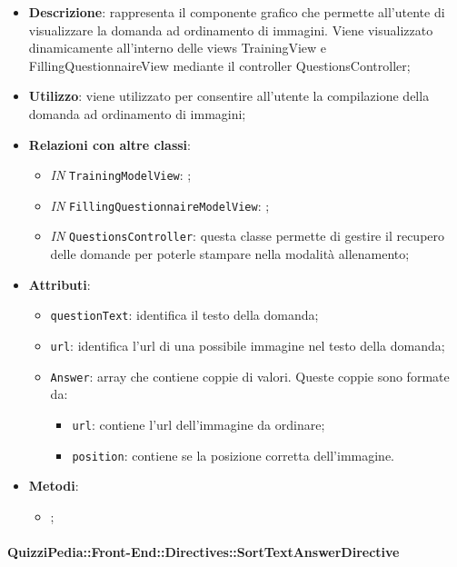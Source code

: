 		\begin{itemize}
			\item \textbf{Descrizione}: rappresenta il componente grafico che permette all'utente di visualizzare la domanda ad ordinamento di immagini. Viene visualizzato dinamicamente all'interno delle views TrainingView e FillingQuestionnaireView mediante il controller QuestionsController;
			\item \textbf{Utilizzo}: viene utilizzato per consentire all'utente la compilazione della domanda ad ordinamento di immagini;
			\item \textbf{Relazioni con altre classi}: 
			\begin{itemize}
				\item \textit{IN} \texttt{TrainingModelView}: ; 
				\item \textit{IN} \texttt{FillingQuestionnaireModelView}: ;
				\item \textit{IN} \texttt{QuestionsController}: questa classe permette di gestire il recupero delle domande per poterle stampare nella modalità allenamento;
			\end{itemize}
			\item \textbf{Attributi}: 
			\begin{itemize}
				\item \texttt{questionText}: identifica il testo della domanda;
				\item \texttt{url}: identifica l'url di una possibile immagine nel testo della domanda;
				\item \texttt{Answer}: array che contiene coppie di valori. Queste coppie sono formate da:
				\begin{itemize}
					\item \texttt{url}: contiene l'url dell'immagine da ordinare;
					\item \texttt{position}: contiene se la posizione corretta dell'immagine.
				\end{itemize}
			\end{itemize}
			\item \textbf{Metodi}: 
			\begin{itemize}
				\item ;
			\end{itemize}
		\end{itemize}
		
		\paragraph{QuizziPedia::Front-End::Directives::SortTextAnswerDirective}
		

